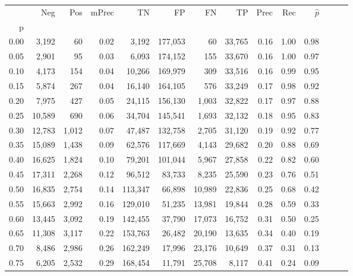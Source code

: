 \begin{tabular}{rrrrrrrrrrrrrr}
\toprule
{} &     Neg &    Pos & mPrec &       TN &       FP &      FN &      TP &  Prec &   Rec & $\hat{p}$ \\
p    &         &        &       &          &          &         &         &       &       &           \\
\midrule
0.00 &   3,192 &     60 &  0.02 &    3,192 &  177,053 &      60 &  33,765 &  0.16 &  1.00 &      0.98 \\
0.05 &   2,901 &     95 &  0.03 &    6,093 &  174,152 &     155 &  33,670 &  0.16 &  1.00 &      0.97 \\
0.10 &   4,173 &    154 &  0.04 &   10,266 &  169,979 &     309 &  33,516 &  0.16 &  0.99 &      0.95 \\
0.15 &   5,874 &    267 &  0.04 &   16,140 &  164,105 &     576 &  33,249 &  0.17 &  0.98 &      0.92 \\
0.20 &   7,975 &    427 &  0.05 &   24,115 &  156,130 &   1,003 &  32,822 &  0.17 &  0.97 &      0.88 \\
0.25 &  10,589 &    690 &  0.06 &   34,704 &  145,541 &   1,693 &  32,132 &  0.18 &  0.95 &      0.83 \\
0.30 &  12,783 &  1,012 &  0.07 &   47,487 &  132,758 &   2,705 &  31,120 &  0.19 &  0.92 &      0.77 \\
0.35 &  15,089 &  1,438 &  0.09 &   62,576 &  117,669 &   4,143 &  29,682 &  0.20 &  0.88 &      0.69 \\
0.40 &  16,625 &  1,824 &  0.10 &   79,201 &  101,044 &   5,967 &  27,858 &  0.22 &  0.82 &      0.60 \\
0.45 &  17,311 &  2,268 &  0.12 &   96,512 &   83,733 &   8,235 &  25,590 &  0.23 &  0.76 &      0.51 \\
0.50 &  16,835 &  2,754 &  0.14 &  113,347 &   66,898 &  10,989 &  22,836 &  0.25 &  0.68 &      0.42 \\
0.55 &  15,663 &  2,992 &  0.16 &  129,010 &   51,235 &  13,981 &  19,844 &  0.28 &  0.59 &      0.33 \\
0.60 &  13,445 &  3,092 &  0.19 &  142,455 &   37,790 &  17,073 &  16,752 &  0.31 &  0.50 &      0.25 \\
0.65 &  11,308 &  3,117 &  0.22 &  153,763 &   26,482 &  20,190 &  13,635 &  0.34 &  0.40 &      0.19 \\
0.70 &   8,486 &  2,986 &  0.26 &  162,249 &   17,996 &  23,176 &  10,649 &  0.37 &  0.31 &      0.13 \\
0.75 &   6,205 &  2,532 &  0.29 &  168,454 &   11,791 &  25,708 &   8,117 &  0.41 &  0.24 &      0.09 \\

\end{tabular}
